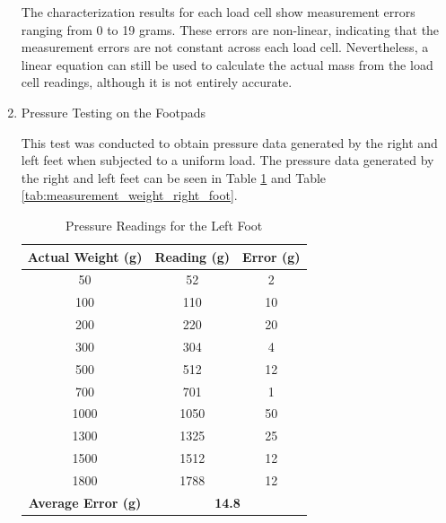 \begin{enumerate}[label=\Alph*.]
        
        \hspace*{1em} The characterization results for each load cell show measurement errors ranging from 0 to 19 grams. These errors are non-linear, indicating that the measurement errors are not constant across each load cell. Nevertheless, a linear equation can still be used to calculate the actual mass from the load cell readings, although it is not entirely accurate.

    \item Pressure Testing on the Footpads
    \label{subsec:results-discussion-pressure}

        \hspace*{1em} This test was conducted to obtain pressure data generated by the right and left feet when subjected to a uniform load. The pressure data generated by the right and left feet can be seen in Table \ref{tab:measurement_weight_left_foot} and Table \ref{tab:measurement_weight_right_foot}.

        \begin{table}[h!]
            \centering
            \caption{Pressure Readings for the Left Foot}
            \begin{tabular}{|c|c|c|}
                \hline
                \textbf{Actual Weight (g)} & \textbf{Reading (g)} & \textbf{Error (g)} \\
                \hline
                50    & 52    & 2   \\
                100   & 110   & 10  \\
                200   & 220   & 20  \\
                300   & 304   & 4   \\
                500   & 512   & 12  \\
                700   & 701   & 1   \\
                1000  & 1050  & 50  \\
                1300  & 1325  & 25  \\
                1500  & 1512  & 12  \\
                1800  & 1788  & 12  \\
                \hline
                \textbf{Average Error (g)} & \multicolumn{2}{c|}{\textbf{14.8}} \\
                \hline
            \end{tabular}
            \label{tab:measurement_weight_left_foot}
        \end{table}


\end{enumerate}

